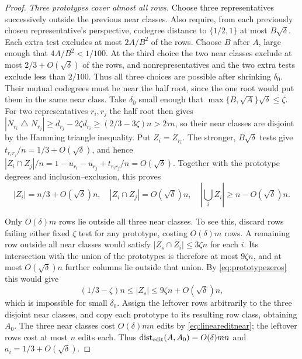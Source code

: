 \documentclass[11pt]{article}
\begin{document}
\begin{proof}
\smallskip\noindent\emph{Three prototypes cover almost all rows.}
Choose three representatives successively outside the previous near
classes. Also require, from each previously chosen representative's
perspective, codegree distance to $\{1/2,1\}$ at most $B\sqrt\delta$.
Each extra test excludes at most $2A/B^2$ of the rows. Choose $B$ after
$A$, large enough that $4A/B^2<1/100$. At the third choice the two
near classes exclude at most $2/3+O(\sqrt\delta)$ of the rows, and
nonrepresentatives and the two extra tests exclude less than $2/100$.
Thus all three choices are possible after shrinking $\delta_0$.
Their mutual codegrees must be near the half root, since the
one root would put them in the same near class. Take $\delta_0$ small
enough that $\max\{B,\sqrt A\}\sqrt\delta\le\zeta$. For two representatives $r_i,r_j$ the
half root then gives
$|N_{r_i}\mathbin\triangle N_{r_j}|\ge d_{r_j}-2\zeta d_{r_i}\ge(2/3-3\zeta)n>2\tau n$,
so their near classes are disjoint by the Hamming triangle inequality.
Put $Z_i=Z_{r_i}$. The stronger, $B\sqrt\delta$ tests give
$t_{r_i r_j}/n=1/3+O(\sqrt\delta)$, and hence
$|Z_i\cap Z_j|/n=1-u_{r_i}-u_{r_j}+t_{r_i r_j}/n=O(\sqrt\delta)$.
Together with the prototype degrees and inclusion--exclusion, this proves
\begin{equation}\label{eq:prototypezeros}
 |Z_i|=n/3+O(\sqrt\delta)n,\quad
 |Z_i\cap Z_j|=O(\sqrt\delta)n,\quad
 |\bigcup_iZ_i|\ge n-O(\sqrt\delta)n.
\end{equation}

Only $O(\delta)m$ rows lie outside all three near classes.
To see this, discard rows failing either fixed $\zeta$ test for any
prototype, costing $O(\delta)m$ rows. A remaining row outside all near
classes would satisfy $|Z_s\cap Z_i|\le3\zeta n$ for each $i$.
Its intersection with the union of the prototypes is therefore at most
$9\zeta n$, and at most $O(\sqrt\delta)n$ further columns lie outside
that union. By \eqref{eq:prototypezeros} this would give
\[
 (1/3-\zeta)n\le|Z_s|\le9\zeta n+O(\sqrt\delta)n,
\]
which is impossible for small $\delta_0$.
Assign the leftover rows arbitrarily to the three disjoint near classes,
and copy each prototype to its resulting row class, obtaining $A_0$.
The three near classes cost $O(\delta)mn$ edits by
\eqref{eq:lineareditnear}; the leftover rows cost at most $n$ edits each.
Thus
$\operatorname{dist}_{\rm edit}(A,A_0)=O(\delta)mn$ and
$a_i=1/3+O(\sqrt\delta)$.


\end{proof}
\end{document}

